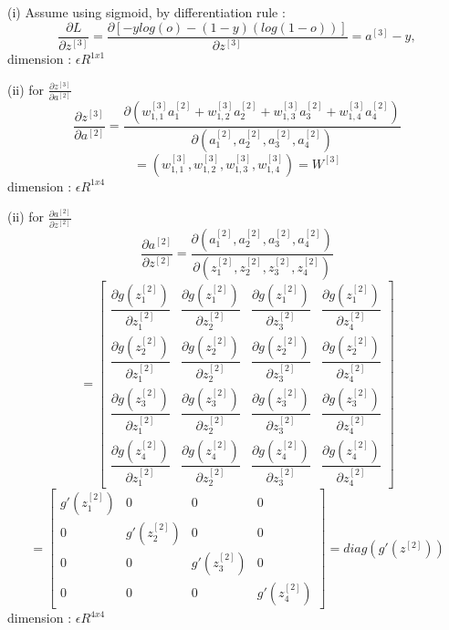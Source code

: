 \documentclass{article}
\begin{document}
(i) Assume using sigmoid, by differentiation rule : \newline
\[ \frac{\partial L }{\partial z^{[3]}} = \frac{\partial [-ylog(o)-(1-y)(log(1-o))] }{\partial z^{[3]}} = a^{[3]}-y ,\]
 dimension :   \( \epsilon R^{1x1} \)  \newline \newline

(ii) for \( \frac{\partial z^{[3]} }{\partial a^{[2]}} \) \newline
\[ 
\frac{\partial z^{[3]} }{\partial a^{[2]}} = 
\frac{\partial (w_{1,1}^{[3]}a_1^{[2]}+w_{1,2}^{[3]}a_2^{[2]}+w_{1,3}^{[3]}a_3^{[2]}+w_{1,4}^{[3]}a_4^{[2]}) }
{\partial (a_1^{[2]},a_2^{[2]},a_3^{[2]},a_4^{[2]})}
\]
\[ 
= (w_{1,1}^{[3]},w_{1,2}^{[3]},w_{1,3}^{[3]},w_{1,4}^{[3]}) = W^{[3]}
\]
dimension :   \( \epsilon R^{1x4} \)  \newline \newline

(ii) for \( \frac{\partial a^{[2]} }{\partial z^{[2]}} \) \newline
\[ 
\frac{\partial a^{[2]} }{\partial z^{[2]}} = 
\frac{\partial (a_1^{[2]},a_2^{[2]},a_3^{[2]},a_4^{[2]}) }
{\partial (z_1^{[2]},z_2^{[2]},z_3^{[2]},z_4^{[2]})}
\]
\[
=\begin{bmatrix}
 \dfrac{\partial g(z_1^{[2]})}{\partial z_1^{[2]}} & \dfrac{\partial g(z_1^{[2]})}{\partial z_2^{[2]}} & \dfrac{\partial g(z_1^{[2]})}{\partial z_3^{[2]}} & \dfrac{\partial g(z_1^{[2]})}{\partial z_4^{[2]}} \\ 
 \dfrac{\partial g(z_2^{[2]})}{\partial z_1^{[2]}} & \dfrac{\partial g(z_2^{[2]})}{\partial z_2^{[2]}} & \dfrac{\partial g(z_2^{[2]})}{\partial z_3^{[2]}} & \dfrac{\partial g(z_2^{[2]})}{\partial z_4^{[2]}} \\ 
 \dfrac{\partial g(z_3^{[2]})}{\partial z_1^{[2]}} & \dfrac{\partial g(z_3^{[2]})}{\partial z_2^{[2]}} & \dfrac{\partial g(z_3^{[2]})}{\partial z_3^{[2]}} & \dfrac{\partial g(z_3^{[2]})}{\partial z_4^{[2]}} \\ 
 \dfrac{\partial g(z_4^{[2]})}{\partial z_1^{[2]}} & \dfrac{\partial g(z_4^{[2]})}{\partial z_2^{[2]}} & \dfrac{\partial g(z_4^{[2]})}{\partial z_3^{[2]}} & \dfrac{\partial g(z_4^{[2]})}{\partial z_4^{[2]}}
\end{bmatrix}
\]
\[
=\begin{bmatrix}
 g'(z_1^{[2]}) & 0 & 0 & 0  \\ 
 0 & g'(z_2^{[2]}) & 0 & 0 \\ 
0 & 0 &  g'(z_3^{[2]}) &0 \\ 
 0 & 0 & 0 & g'(z_4^{[2]})
\end{bmatrix} = diag(g'(z^{[2]}))
\]
dimension :   \( \epsilon R^{4x4} \)  \newline \newline
\end{document}
